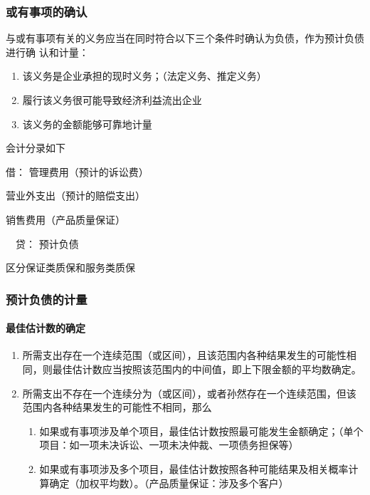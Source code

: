 \documentclass[UTF8,12pt]{ctexart}
\newenvironment{Dr}{\noindent 借：}{\par}
\newenvironment{Cr}{\noindent \ \ 贷：}{\par}
\numberwithin{equation}{section} %
\numberwithin{figure}{section}
\numberwithin{table}{section}
\begin{document}
	\subsubsection{或有事项的确认}
	与或有事项有关的义务应当在同时符合以下三个条件时确认为负债，作为预计负债进行确   认和计量：
	\begin{enumerate}
		\item 该义务是企业承担的现时义务；（法定义务、推定义务）
		
		\item 履行该义务很可能导致经济利益流出企业
		
		\item 该义务的金额能够可靠地计量
	\end{enumerate}
	
	会计分录如下
	
	\begin{Dr}
		管理费用（预计的诉讼费）
		
		营业外支出（预计的赔偿支出） 
		
		销售费用（产品质量保证）
	\end{Dr}
	\begin{Cr}
		预计负债
	\end{Cr}

	区分保证类质保和服务类质保
	
	\subsubsection{预计负债的计量}
	\paragraph{最佳估计数的确定}
	\begin{enumerate}
		\item 所需支出存在一个连续范围（或区间），且该范围内各种结果发生的可能性相同，则最佳估计数应当按照该范围内的中间值，即上下限金额的平均数确定。
		
		\item 所需支出不存在一个连续分为（或区间），或者孙然存在一个连续范围，但该范围内各种结果发生的可能性不相同，那么
		\begin{enumerate}
			\item 如果或有事项涉及单个项目，最佳估计数按照最可能发生金额确定；（单个项目：如一项未决诉讼、一项未决仲裁、一项债务担保等）
			
			\item 如果或有事项涉及多个项目，最佳估计数按照各种可能结果及相关概率计算确定（加权平均数）。（产品质量保证：涉及多个客户）
		\end{enumerate}
	\end{enumerate}
	
\end{document}
